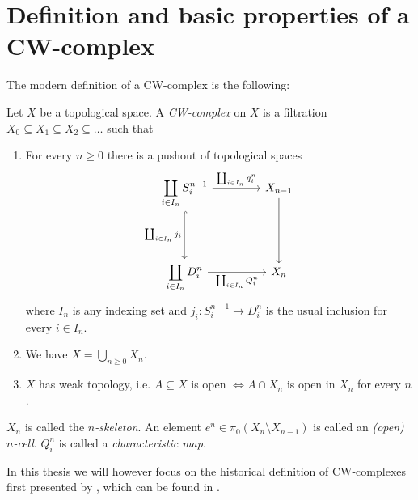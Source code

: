\section{Definition and basic properties of a CW-complex}
\label{sec:mathsdef}

The modern definition of a CW-complex is the following:

\begin{defi}\label{defi:CWComplex1}
    Let $X$ be a topological space.
    A \emph{CW-complex} on $X$ is a filtration
    $X_0 \subseteq X_1 \subseteq X_2 \subseteq \dots$ such that
    \begin{enumerate}
        \item For every $n \ge 0$ there is a pushout of topological spaces
            \[
            \begin{tikzcd}[row sep = 1.5cm, column sep = 1.5cm]
                \displaystyle \coprod_{i \in I_n}S_i^{n - 1} \arrow[r, "\coprod_{i \in I_n}q_i^n"] \arrow[d, hook, "\coprod_{i \in I_n} j_i"'] & X_{n- 1} \arrow[d] \\
                \displaystyle \coprod_{i \in I_n}D_i^n \arrow[r, "\coprod_{i \in I_n} Q_i^n"'] & X_n
            \end{tikzcd}
            \]
            where $I_n$ is any indexing set and $j_i \colon S_i^{n - 1} \to D_i^n$ is the usual inclusion for every $i \in I_n$.
        \item We have $X = \bigcup_{n \ge 0} X_n$.
        \item $X$ has weak topology, i.e. $A \subseteq X$ is open $\iff A \cap X_n$ is open in $X_n$ for every $n$.
    \end{enumerate}
    $X_n$ is called the \emph{$n$-skeleton}.
    An element $e^n \in \pi_0 (X_n \setminus X_{n - 1})$ is called an \emph{(open) $n$-cell}.
    $Q_i^n$ is called a \emph{characteristic map}.
\end{defi}


In this thesis we will however focus on the historical definition of CW-complexes first presented by , which can be found in \cite{Whitehead2018}.


